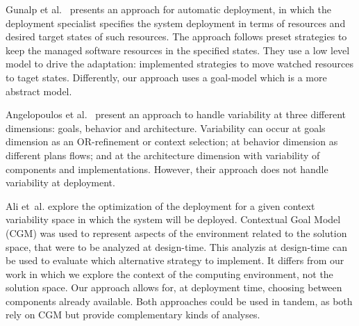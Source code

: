 Gunalp et al.~\citep{gunalp_rondo_2015} presents an approach for automatic deployment, in which the deployment specialist specifies the system deployment in terms of resources and desired target states of such resources. The approach follows preset strategies to keep the managed software resources in the specified states. They use a low level model to drive the adaptation: implemented strategies to move watched resources to taget states. Differently, our approach uses a goal-model which is a more abstract model.

Angelopoulos et al.~\cite{angelopoulos_capturing_2015} present an approach to handle  variability at three different dimensions: goals, behavior and architecture. Variability can occur at goals dimension as an OR-refinement or context selection; at behavior dimension as different plans flows; and at the architecture dimension with variability of components and implementations. However, their approach does not handle variability at deployment.


Ali et~al.\cite{ali_requirements-driven_2014} explore the optimization of the deployment for a given context variability space in which the system will be deployed. Contextual Goal Model (CGM) was used to represent aspects of the environment related to the solution space, that were to be analyzed at design-time. This analyzis at design-time can be used to evaluate which alternative strategy to implement.
It differs from our work in which we explore the context of the computing environment, not the solution space. Our approach allows for, at deployment time, choosing  between components already available. Both approaches could be used in tandem, as both rely on CGM but provide complementary kinds of analyses.



